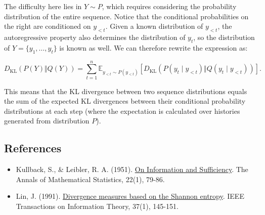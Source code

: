 The difficulty here lies in \(Y\sim P\), which requires considering the probability distribution of the entire sequence. Notice that the conditional probabilities on the right are conditioned on \(y_{<t}\). Given a known distribution of \(y_{<t}\), the autoregressive property also determines the distribution of \(y_t\), so the distribution of \(Y=\{y_1,\ldots,y_t\}\) is known as well. We can therefore rewrite the expression as:

\[
D_{\mathrm{KL}}(P(Y)\Vert Q(Y))
=
\sum_{t=1}^{n}
\mathbb{E}_{y_{<t}\sim P(y_{<t})}
\left[
D_{\mathrm{KL}}\left(P(y_t\mid y_{<t})\Vert Q(y_t\mid y_{<t})\right)
\right].
\]

This means that the KL divergence between two sequence distributions equals the sum of the expected KL divergences between their conditional probability distributions at each step (where the expectation is calculated over histories generated from distribution \(P\)).

\FloatBarrier
{}
\hypertarget{references-107}{%
\subsection{References}\label{references-107}}

\vspace{0.25em}
\begin{itemize}
\tightlist
\item
  Kullback, S., \& Leibler, R. A. (1951). \href{https://doi.org/10.1214/aoms/1177729694}{On Information and Sufficiency}. The Annals of Mathematical Statistics, 22(1), 79-86.
\item
  Lin, J. (1991). \href{https://doi.org/10.1109/18.61115}{Divergence measures based on the Shannon entropy}. IEEE Transactions on Information Theory, 37(1), 145-151.
\end{itemize}

\clearpage
